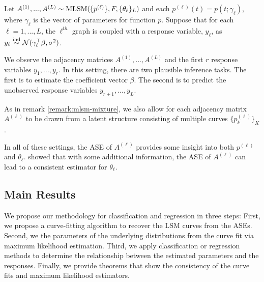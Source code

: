 \documentclass[12pt]{article}
\begin{document}
\begin{definition}
\label{def:mlsm-r-2}
Let $A^{(1)}, ..., A^{(L)} \sim \mathrm{MLSM}(\{p^{(\ell)}\}, F, \{\theta_\ell\}_L)$ and each $p^{(\ell)}(t) = p(t; \gamma_\ell)$, where $\gamma_\ell$ is the vector of parameters for function $p$. 
Suppose that for each $\ell = 1, ..., L$, the $\ell^{th}$ graph is coupled with a response variable, $y_\ell$, as $y_\ell \stackrel{\mathrm{ind}}{\sim} \mathcal{N}(\gamma_\ell^\top \beta, \sigma^2)$. 

We observe the adjacency matrices $A^{(1)}, ..., A^{(L)}$ and the first $r$ response variables $y_1, ..., y_r$. 
In this setting, there are two plausible inference tasks. 
The first is to estimate the coefficient vector $\beta$. 
The second is to predict the unobserved response variables $y_{r+1}, ..., y_L$. 

As in remark \ref{remark:mlsm-mixture}, we also allow for each adjacency matrix $A^{(\ell)}$ to be drawn from a latent structure consisting of multiple curves $\{p^{(\ell)}_k\}_K$. 
\end{definition}

In all of these settings, the ASE of \(A^{(\ell)}\) provides some
insight into both \(p^{(\ell)}\) and \(\theta_\ell\).
\citet{athreya2020estimation} showed that with some additional
information, the ASE of \(A^{(\ell)}\) can lead to a consistent
estimator for \(\theta_\ell\).

\subsection{Main Results}\label{main-results}

We propose our methodology for classification and regression in three
steps: First, we propose a curve-fitting algorithm to recover the LSM
curves from the ASEs. Second, we the parameters of the underlying
distributions from the curve fit via maximum likelihood estimation.
Third, we apply classification or regression methods to determine the
relationship between the estimated parameters and the responses.
Finally, we provide theorems that show the consistency of the curve fits
and maximum likelihood estimators.
\end{document}
